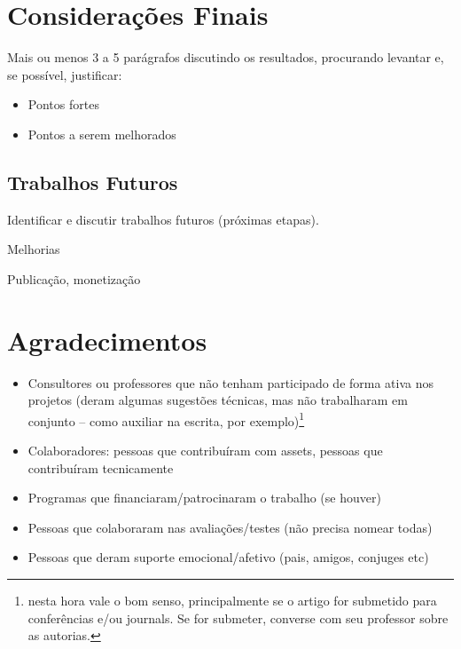 \section{Considerações Finais}
\label{secao:consideracoes_finais}
Mais ou menos 3 a 5 parágrafos discutindo os resultados, procurando levantar e, se possível, justificar:

\begin{itemize}
    \item Pontos fortes 
    \item Pontos a serem melhorados
\end{itemize}

\subsection{Trabalhos Futuros}
Identificar e discutir trabalhos futuros (próximas etapas).

Melhorias​

Publicação, monetização


\section*{Agradecimentos}

\begin{itemize}
    \item Consultores ou professores que não tenham participado de forma ativa nos projetos (deram
algumas sugestões técnicas, mas não trabalharam em conjunto – como auxiliar na escrita, por exemplo)\footnote{nesta hora vale o bom senso, principalmente se o artigo for submetido para conferências e/ou journals. Se for submeter, converse com seu professor sobre as autorias.}
    \item Colaboradores: pessoas que contribuíram com assets, pessoas que contribuíram tecnicamente
    \item Programas que financiaram/patrocinaram o trabalho (se houver)
    \item Pessoas que colaboraram nas avaliações/testes (não precisa nomear todas) 
    \item Pessoas que deram suporte emocional/afetivo (pais, amigos, conjuges etc)
\end{itemize}